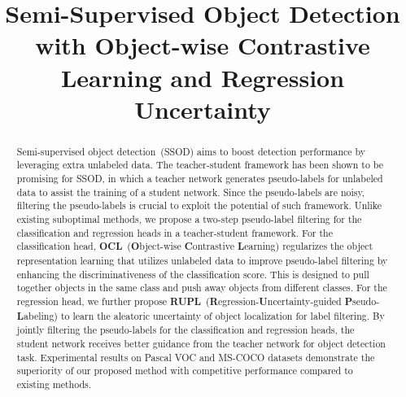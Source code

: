 \documentclass{bmvc2k}
\title{Semi-Supervised Object Detection with Object-wise Contrastive Learning and Regression Uncertainty}
\begin{document}
\maketitle
\begin{abstract}
  Semi-supervised object detection~(SSOD) aims to boost detection performance by leveraging extra unlabeled data.
  The teacher-student framework has been shown to be promising for SSOD, in which a teacher network generates pseudo-labels for unlabeled data to assist the training of a student network.
  Since the pseudo-labels are noisy, filtering the pseudo-labels
  is crucial to exploit the potential of such framework.
  Unlike existing suboptimal methods,
  we propose a two-step pseudo-label filtering
  for the classification and regression heads in a teacher-student framework.
  For the classification head, \textbf{OCL}~(\textbf{O}bject-wise \textbf{C}ontrastive \textbf{L}earning) regularizes the object representation learning that utilizes unlabeled data to improve pseudo-label filtering by enhancing the discriminativeness of the classification score.
  This is designed to pull together objects in the same class and push away objects from different classes.
  For the regression head, we further propose \textbf{RUPL}~(\textbf{R}egression-\textbf{U}ncertainty-guided \textbf{P}seudo-\textbf{L}abeling) to learn the aleatoric uncertainty of object localization for label filtering.
  By jointly filtering the pseudo-labels for the classification and regression heads, the student network receives better guidance from the teacher network for object detection task. 
  Experimental results on Pascal VOC and MS-COCO datasets demonstrate the superiority of our proposed method with competitive performance compared to existing methods.
  

\end{abstract}
\end{document}
